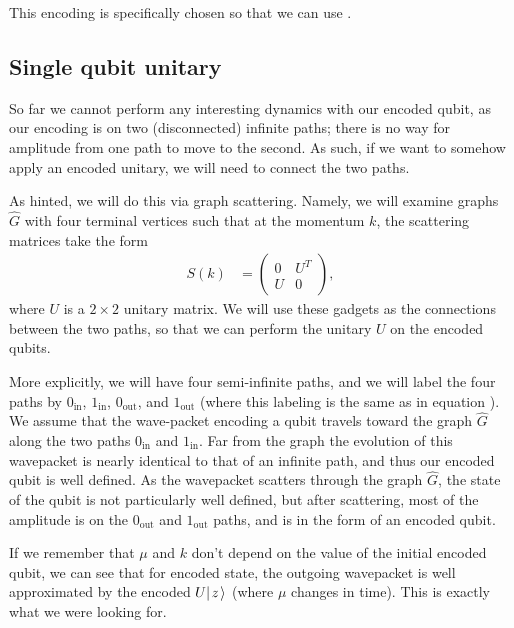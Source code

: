 \documentclass[../thesis-main/thesis-main]{subfiles}
\begin{document}
This encoding is specifically chosen so that we can use .

\subsection{Single qubit unitary}

So far we cannot perform any interesting dynamics with our encoded qubit, as our encoding is on two (disconnected) infinite paths; there is no way for amplitude from one path to move to the second.  As such, if we want to somehow apply an encoded unitary, we will need to connect the two paths.

As  hinted, we will do this via graph scattering.  Namely, we will examine graphs $\widehat{G}$ with four terminal vertices such that at the momentum $k$, the scattering matrices take the form
\begin{align}
  S(k) &= \begin{pmatrix} 0 & U^{T} \\
  U & 0\end{pmatrix},
  \label{eq:unitary_s_matrix}
\end{align}
where $U$ is a $2\times 2$ unitary matrix. We will use these gadgets as the connections between the two paths, so that we can perform the unitary $U$ on the encoded qubits.

More explicitly, we will have four semi-infinite paths, and we will label the four paths by $0_{\text{in}}$, $1_{\text{in}}$, $0_{\text{out}}$, and $1_{\text{out}}$ (where this labeling is the same as in equation ).  We assume that the wave-packet encoding a qubit travels toward the graph $\widehat{G}$ along the two paths $0_{\text{in}}$ and $1_{\text{in}}$.  Far from the graph the evolution of this wavepacket is nearly identical to that of an infinite path, and thus our encoded qubit is well defined.  As the wavepacket scatters through the graph $\widehat{G}$, the state of the qubit is not particularly well defined, but after scattering, most of the amplitude is on the $0_{\text{out}}$ and $1_{\text{out}}$ paths, and is in the form of an encoded qubit.  

If we remember that $\mu$ and $k$ don't depend on the value of the initial encoded qubit, we can see that for  encoded state, the outgoing wavepacket is well approximated by the encoded $U|\mspace{2mu} z \mspace{2mu} \rangle$ (where $\mu$ changes in time).  This is exactly what we were looking for.
\end{document}
